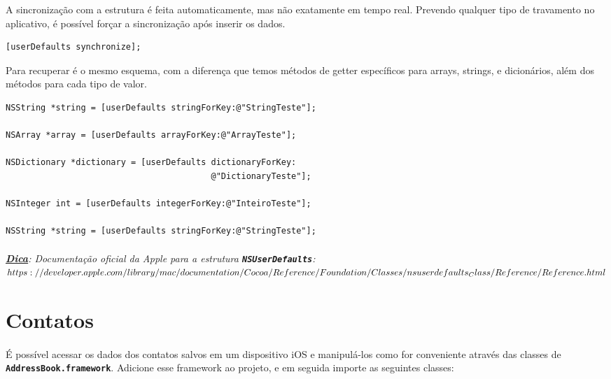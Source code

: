 \documentclass[a4paper,12pt,brazil,doubleside]{book}
\begin{document}
A sincronização com a estrutura é feita automaticamente, mas não exatamente em tempo real. Prevendo qualquer tipo de travamento no aplicativo, é possível forçar a sincronização após inserir os dados.

\begin{listing}
\begin{verbatim}
[userDefaults synchronize];
\end{verbatim}
\end{listing}

Para recuperar é o mesmo esquema, com a diferença que temos métodos de getter específicos para arrays, strings, e dicionários, além dos métodos para cada tipo de valor.

\begin{listing}
\begin{verbatim}
NSString *string = [userDefaults stringForKey:@"StringTeste"];

NSArray *array = [userDefaults arrayForKey:@"ArrayTeste"];

NSDictionary *dictionary = [userDefaults dictionaryForKey:
                                         @"DictionaryTeste"];

NSInteger int = [userDefaults integerForKey:@"InteiroTeste"];

NSString *string = [userDefaults stringForKey:@"StringTeste"];
\end{verbatim}
\end{listing}

\paragraph{}\textit{\textbf{\underline{Dica}}: Documentação oficial da Apple para a estrutura \texttt{\textbf{NSUserDefaults}}:\\
\(https://developer.apple.com/library/mac/documentation/Cocoa/Reference/Foundation/\\Classes/nsuserdefaults_Class/Reference/Reference.html
\)}

\bigskip


\section{Contatos}

\paragraph{}É possível acessar os dados dos contatos salvos em um dispositivo iOS e manipulá-los como for conveniente através das classes de \texttt{\textbf{AddressBook.framework}}. Adicione esse framework ao projeto, e em seguida importe as seguintes classes:
\end{document}
